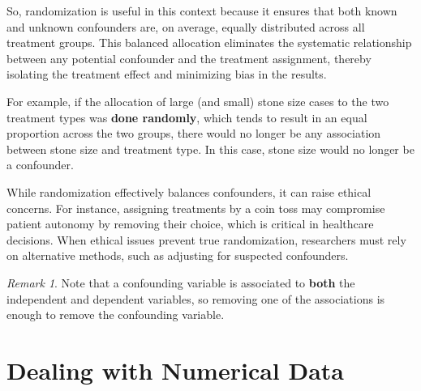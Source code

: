 \documentclass[math,code]{amznotes}
\theoremstyle{remark}
\newtheorem*{remark}{Remark}
\begin{document}
So, randomization is useful in this context because it ensures that both known and unknown confounders are, on average, equally distributed across all treatment groups. This balanced allocation eliminates the systematic relationship between any potential confounder and the treatment assignment, thereby isolating the treatment effect and minimizing bias in the results.

For example, if the allocation of large (and small) stone size cases to the two treatment types was \textbf{done randomly}, which tends to result in an equal proportion across the two groups, there would no longer be any association between stone size and treatment type. In this case, stone size would no longer be a confounder.

While randomization effectively balances confounders, it can raise ethical concerns. For instance, assigning treatments by a coin toss may compromise patient autonomy by removing their choice, which is critical in healthcare decisions. When ethical issues prevent true randomization, researchers must rely on alternative methods, such as adjusting for suspected confounders.

\begin{notebox}
    \begin{remark}
        Note that a confounding variable is associated to \textbf{both} the independent and dependent variables, so removing one of the associations is enough to remove the confounding variable.
    \end{remark}
\end{notebox}

\chapter{Dealing with Numerical Data}
\end{document}

